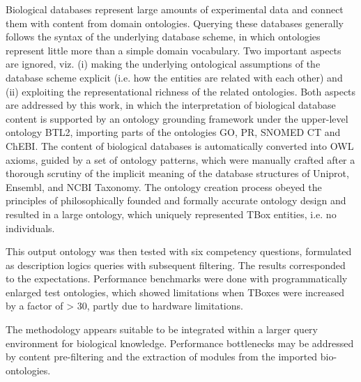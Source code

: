 Biological databases represent large amounts of experimental data and connect them with content from domain ontologies. Querying these databases generally follows the syntax of the underlying database scheme, in which ontologies represent little more than a simple domain vocabulary. Two important aspects are ignored, viz. (i) making the underlying ontological assumptions of the database scheme explicit (i.e. how the entities are related with each other) and (ii) exploiting the representational richness of the related ontologies. 
Both aspects are addressed by this work, in which the interpretation of biological database 
content is supported by an ontology grounding framework under the upper-level ontology BTL2, 
importing parts of the ontologies GO, PR, SNOMED CT and ChEBI. 
The content of biological databases is automatically converted into OWL axioms, 
guided by a set of ontology patterns, which were manually crafted after a 
thorough scrutiny of the implicit meaning of the database structures of Uniprot, Ensembl, 
and NCBI Taxonomy. The ontology creation process obeyed the principles of 
philosophically founded and formally accurate ontology design and resulted 
in a large ontology, which uniquely represented TBox entities, i.e. no individuals. 

This output ontology was then tested with six competency questions, formulated as description logics queries with subsequent filtering. The results corresponded to the expectations. Performance benchmarks were done with programmatically enlarged test ontologies, which showed limitations when TBoxes were increased by a factor of  > 30, partly due to hardware limitations.

The methodology appears suitable to be integrated within a larger query environment for biological knowledge. Performance bottlenecks may be addressed by content pre-filtering and the extraction of modules from the imported bio-ontologies.   

 


